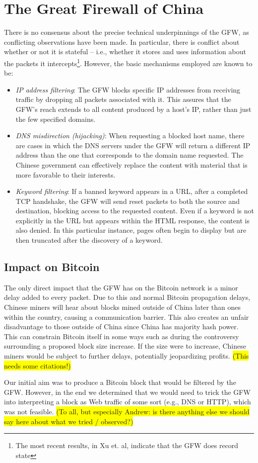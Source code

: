 \section{The Great Firewall of China}
There is no consensus about the precise technical underpinnings of the GFW, as conflicting observations have been made. In particular, there is conflict about whether or not it is stateful -- i.e., whether it stores and uses information about the packets it intercepts\footnote{The most recent results, in Xu et. al\cite{Xu2011}, indicate that the GFW does record state}. However, the basic mechanisms employed are known to be\cite{GFWStanford}:

\begin{itemize}
\item \textit{IP address filtering}:
The GFW blocks specific IP addresses from receiving traffic by dropping all packets associated with it. This assures that the GFW's reach extends to all content produced by a host's IP, rather than just the few specified domains.

\item \textit{DNS misdirection (hijacking)}:
When requesting a blocked host name, there are cases in which the DNS servers under the GFW will return a different IP address than the one that corresponds to the domain name requested. The Chinese government can effectively replace the content with material that is more favorable to their interests.

\item \textit{Keyword filtering}:
If a banned keyword appears in a URL, after a completed TCP handshake, the GFW will send reset packets to both the source and destination, blocking access to the requested content. Even if a keyword is not explicitly in the URL but appears within the HTML response, the content is also denied. In this particular instance, pages often begin to display but are then truncated after the discovery of a keyword.
\end{itemize}

\subsection{Impact on Bitcoin}
The only direct impact that the GFW has on the Bitcoin network is a minor delay added to every packet. Due to this and normal Bitcoin propagation delays, Chinese miners will hear about blocks mined outside of China later than ones within the country, causing a communication barrier. This also creates an unfair disadvantage to those outside of China since China has majority hash power. This can constrain Bitcoin itself in some ways such as during the controversy surrounding a proposed block size increase. If the size were to increase, Chinese miners would be subject to further delays, potentially jeopardizing profits. \colorbox{yellow}{(This needs some citations!)}

Our initial aim was to produce a Bitcoin block that would be filtered by the GFW. However, in the end we determined that we would need to trick the GFW into interpreting a block as Web traffic of some sort (e.g., DNS or HTTP), which was not feasible. \colorbox{yellow}{(To all, but especially Andrew: is there anything else we should say here about what we tried / observed?)}